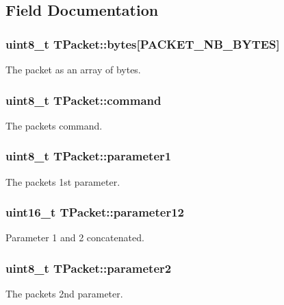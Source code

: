\subsection{Field Documentation}
\hypertarget{union_t_packet_a27c34aeafd4c778f8e489e4c38436ddf}{}
\subsubsection[{bytes}]{\setlength{\rightskip}{0pt plus 5cm}uint8\+\_\+t T\+Packet\+::bytes\mbox{[}P\+A\+C\+K\+E\+T\+\_\+\+N\+B\+\_\+\+B\+Y\+T\+E\+S\mbox{]}}\label{union_t_packet_a27c34aeafd4c778f8e489e4c38436ddf}
The packet as an array of bytes. \hypertarget{union_t_packet_a5cec09aa383544e7b1413e08205d09ea}{}
\subsubsection[{command}]{\setlength{\rightskip}{0pt plus 5cm}uint8\+\_\+t T\+Packet\+::command}\label{union_t_packet_a5cec09aa383544e7b1413e08205d09ea}
The packet\textquotesingle{}s command. \hypertarget{union_t_packet_a9092cb6480edf4918477b59d9c67938e}{}
\subsubsection[{parameter1}]{\setlength{\rightskip}{0pt plus 5cm}uint8\+\_\+t T\+Packet\+::parameter1}\label{union_t_packet_a9092cb6480edf4918477b59d9c67938e}
The packet\textquotesingle{}s 1st parameter. \hypertarget{union_t_packet_a84940acc736f6d6379c6ebd65dfd05eb}{}
\subsubsection[{parameter12}]{\setlength{\rightskip}{0pt plus 5cm}uint16\+\_\+t T\+Packet\+::parameter12}\label{union_t_packet_a84940acc736f6d6379c6ebd65dfd05eb}
Parameter 1 and 2 concatenated. \hypertarget{union_t_packet_a0a5a82f359bb43dc5b9f412d5f1de33c}{}
\subsubsection[{parameter2}]{\setlength{\rightskip}{0pt plus 5cm}uint8\+\_\+t T\+Packet\+::parameter2}\label{union_t_packet_a0a5a82f359bb43dc5b9f412d5f1de33c}
The packet\textquotesingle{}s 2nd parameter. \hypertarget{union_t_packet_a92905f7e01f01bd1439dc4668b6808c1}{}
